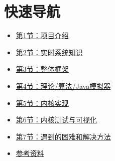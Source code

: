 
\section*{快速导航}
\begin{itemize}
    \item \hyperref[sec:intro]{第1节：项目介绍}
    \item \hyperref[sec:realtime]{第2节：实时系统知识}
    \item \hyperref[sec:design]{第3节：整体框架}
    \item \hyperref[sec:theory]{第4节：理论/算法/Java模拟器}
    \item \hyperref[sec:kernel]{第5节：内核实现}
    \item \hyperref[sec:test]{第6节：内核测试与可视化}
    \item \hyperref[sec:difficulties]{第7节：遇到的困难和解决方法}
    \item \hyperref[sec:refs]{参考资料}
\end{itemize}

